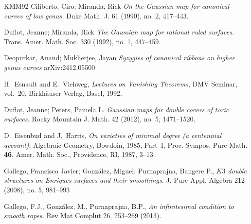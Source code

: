 \documentclass[11pt,twoside]{amsart}
\theoremstyle{plain}
\numberwithin{equation}{section}
\theoremstyle{definition}
\begin{document}
\begin{thebibliography}{KMM92}
Ciliberto, Ciro; Miranda, Rick
\emph{On the Gaussian map for canonical curves of low genus.}
Duke Math. J. 61 (1990), no. 2, 417–443.

Duflot, Jeanne; Miranda, Rick
\emph{The Gaussian map for rational ruled surfaces.}
Trans. Amer. Math. Soc. 330 (1992), no. 1, 447–459.

Deopurkar, Anand; Mukherjee, Jayan
\emph{Syzygies of canonical ribbons on higher genus curves}
arXiv:2412.05500


H.~Esnault and E.~Viehweg,
\emph{Lectures on Vanishing Theorems},
DMV Seminar, vol.~20, Birkh\"auser Verlag, Basel, 1992.

Duflot, Jeanne; Peters, Pamela L.
\emph{Gaussian maps for double covers of toric surfaces.}
Rocky Mountain J. Math. 42 (2012), no. 5, 1471–1520.

D.~Eisenbud and J.~Harris,
\emph{On varieties of minimal degree (a centennial account)},
Algebraic Geometry, Bowdoin, 1985, Part~I,
Proc. Sympos. Pure Math. \textbf{46},
Amer. Math. Soc., Providence, RI, 1987, 3--13.











 

\color{black}




Gallego, Francisco Javier; González, Miguel; Purnaprajna, Bangere P., 
\emph{$K3$ double structures on Enriques surfaces and their smoothings.}
J. Pure Appl. Algebra 212 (2008), no. 5, 981--993

Gallego, F.J., González, M., Purnaprajna, B.P., 
\emph{An infinitesimal condition to smooth ropes.}
Rev Mat Complut 26, 253–269 (2013).


\end{thebibliography}
\end{document}
